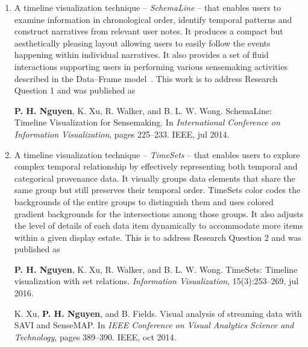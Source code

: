 \begin{enumerate}
	\item A timeline visualization technique -- \emph{SchemaLine} -- that enables users to examine information in chronological order, identify temporal patterns and construct narratives from relevant user notes. It produces a compact but aesthetically pleasing layout allowing users to easily follow the events happening within individual narratives. It also provides a set of fluid interactions supporting users in performing various sensemaking activities described in the Data--Frame model~\cite{Klein2003}. This work is to address Research Question 1 and was published as 
	
	\qquad\textbf{P. H. Nguyen}, K. Xu, R. Walker, and B. L. W. Wong. SchemaLine: Timeline Visualization for Sensemaking. In \textit{International Conference on Information Visualization}, pages 225--233. IEEE, jul 2014.
	
	\item A timeline visualization technique -- \emph{TimeSets} -- that enables users to explore complex temporal relationship by effectively representing both temporal and categorical provenance data. It visually groups data elements that share the same group but still preserves their temporal order. TimeSets color codes the backgrounds of the entire groups to distinguish them and uses colored gradient backgrounds for the intersections among those groups. It also adjusts the level of details of each data item dynamically to accommodate more items within a given display estate. This is to address Research Question 2 and was published as  
	
	\qquad\textbf{P. H. Nguyen}, K. Xu, R. Walker, and B. L. W. Wong. TimeSets: Timeline visualization with set relations. \textit{Information Visualization}, 15(3):253--269, jul 2016. 
	
	\qquad K. Xu, \textbf{P. H. Nguyen}, and B. Fields. Visual analysis of streaming data with SAVI and SenseMAP. In \textit{IEEE Conference on Visual Analytics Science and Technology}, pages 389--390. IEEE, oct 2014.
	 

\end{enumerate}
